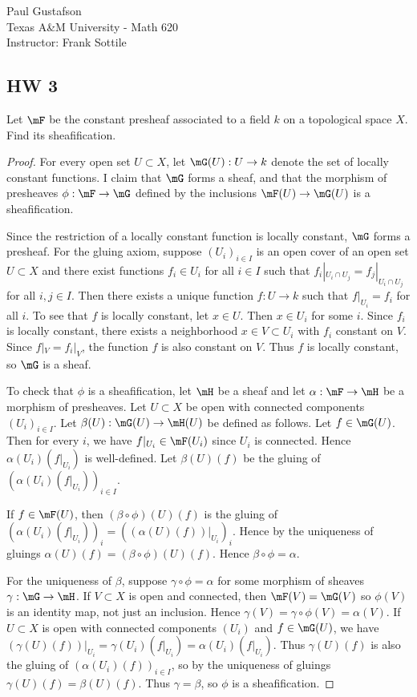 \documentclass{article}
\begin{document}
\noindent Paul Gustafson\\
\noindent Texas A\&M University - Math 620\\ 
\noindent Instructor: Frank Sottile

\subsection*{HW 3}
 Let $\mF$ be the constant presheaf associated to a field $k$ on a topological space $X$.  Find its sheafification.
\begin{proof}
For every open set $U \subset X$, let $\mG(U): U \to k$ denote the set of locally constant functions.  I claim that $\mG$ forms a sheaf, and that the morphism of presheaves $\phi: \mF \to \mG$ defined by the inclusions $\mF(U) \to \mG(U)$ is a sheafification.

Since the restriction of a locally constant function is locally constant, $\mG$ forms a presheaf. For the gluing axiom, suppose $(U_i)_{i \in I}$ is an open cover of an open set $U \subset X$ and there exist functions $f_i \in U_i$ for all $i \in I$ such that $f_i|_{U_i \cap U_j} = f_j|_{U_i \cap U_j}$ for all $i,j \in I$. Then there exists a unique function $f: U \to k$ such that $f|_{U_i} = f_i$ for all $i$.  To see that $f$ is locally constant, let $x \in U$.  Then $x \in U_i$ for some $i$.  Since $f_i$ is locally constant, there exists a neighborhood $x \in V \subset U_i$ with $f_i$ constant on $V$.  Since $f|_V = f_i|_V$, the function $f$ is also constant on $V$.  Thus $f$ is locally constant, so $\mG$ is a sheaf.

To check that $\phi$ is a sheafification, let $\mH$ be a sheaf and let $\alpha: \mF \to \mH$ be a morphism of presheaves. Let $U \subset X$ be open with connected components $(U_i)_{i \in I}$. Let $\beta(U): \mG(U) \to \mH(U)$ be defined as follows. Let $f \in \mG(U)$.  Then for every $i$, we have $f|_{U_i} \in \mF(U_i)$ since $U_i$ is connected. Hence $\alpha(U_i)(f|_{U_i})$ is well-defined.   Let $\beta(U)(f)$ be the gluing of $(\alpha(U_i)(f|_{U_i}))_{i \in I}$. 

If $f \in \mF(U)$, then  $(\beta \circ \phi)(U)(f)$ is the gluing of $(\alpha(U_i)(f|_{U_i}))_i = ((\alpha(U)(f))|_{U_i})_i$. Hence by the uniqueness of gluings $\alpha(U)(f) = (\beta \circ \phi)(U)(f)$.  Hence $\beta \circ \phi = \alpha$.

For the uniqueness of $\beta$, suppose $\gamma \circ \phi = \alpha$ for some morphism of sheaves $\gamma: \mG \to \mH$. If $V \subset X$ is open and connected, then $\mF(V) = \mG(V)$ so $\phi(V)$ is an identity map, not just an inclusion.  Hence $\gamma(V) = \gamma \circ \phi(V) = \alpha(V)$. If $U \subset X$ is open with connected components $(U_i)$ and $f \in \mG(U)$, we have $(\gamma(U)(f))|_{U_i} = \gamma(U_i)(f|_{U_i}) = \alpha(U_i)(f|_{U_i}) $.  Thus $\gamma(U)(f)$ is also the gluing of $(\alpha(U_i)(f))_{i \in I}$, so by the uniqueness of gluings $\gamma(U)(f) = \beta(U)(f)$.  Thus $\gamma = \beta$, so $\phi$ is a sheafification.
\end{proof}
\end{document}
